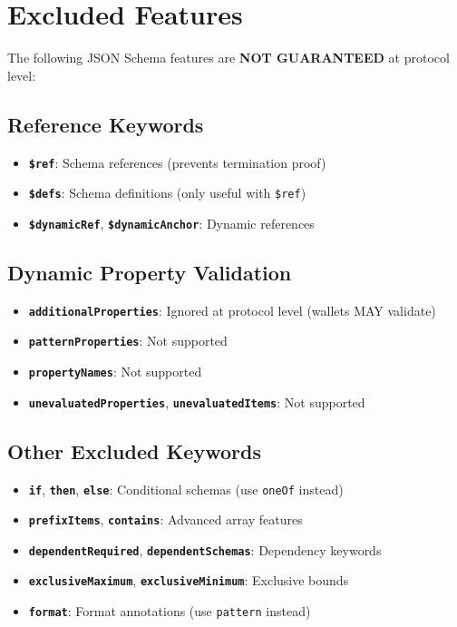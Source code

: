 \section{Excluded Features}

The following JSON Schema features are \textbf{NOT GUARANTEED} at protocol level:

\subsection{Reference Keywords}

\begin{itemize}
  \item \textbf{\texttt{\$ref}}: Schema references (prevents termination proof)
  \item \textbf{\texttt{\$defs}}: Schema definitions (only useful with \texttt{\$ref})
  \item \textbf{\texttt{\$dynamicRef}}, \textbf{\texttt{\$dynamicAnchor}}: Dynamic references
\end{itemize}

\subsection{Dynamic Property Validation}

\begin{itemize}
  \item \textbf{\texttt{additionalProperties}}: Ignored at protocol level (wallets MAY validate)
  \item \textbf{\texttt{patternProperties}}: Not supported
  \item \textbf{\texttt{propertyNames}}: Not supported
  \item \textbf{\texttt{unevaluatedProperties}}, \textbf{\texttt{unevaluatedItems}}: Not supported
\end{itemize}

\subsection{Other Excluded Keywords}

\begin{itemize}
  \item \textbf{\texttt{if}}, \textbf{\texttt{then}}, \textbf{\texttt{else}}: Conditional schemas (use \texttt{oneOf} instead)
  \item \textbf{\texttt{prefixItems}}, \textbf{\texttt{contains}}: Advanced array features
  \item \textbf{\texttt{dependentRequired}}, \textbf{\texttt{dependentSchemas}}: Dependency keywords
  \item \textbf{\texttt{exclusiveMaximum}}, \textbf{\texttt{exclusiveMinimum}}: Exclusive bounds
  \item \textbf{\texttt{format}}: Format annotations (use \texttt{pattern} instead)
\end{itemize}

